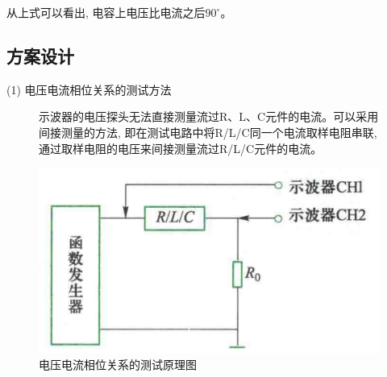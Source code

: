 \documentclass[10pt, a4paper]{article} %
\begin{document}
从上式可以看出, 电容上电压比电流之后$90^{\circ}$。
\newpage
\subsection{方案设计}
(1) 电压电流相位关系的测试方法

\begin{figure}[ht]
\centering
\begin{minipage}[ht]{0.5\textwidth} %
    示波器的电压探头无法直接测量流过R、L、C元件的电流。可以采用间接测量的方法, 即在测试电路中将R/L/C同一个电流取样电阻串联, 通过取样电阻的电压来间接测量流过R/L/C元件的电流。
\end{minipage}%
\hfill %
\begin{minipage}[ht]{0.45\textwidth} %
    \centering
    \includegraphics[width=\linewidth]{image/1.png} %
    \caption{电压电流相位关系的测试原理图}
    \label{fig:side:a}
\end{minipage}
\end{figure}
\end{document}
